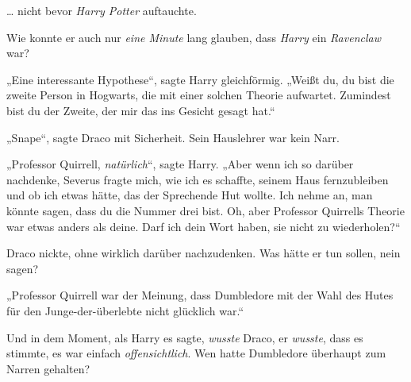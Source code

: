 … nicht bevor \emph{Harry Potter} auftauchte.

Wie konnte er auch nur \emph{eine Minute} lang glauben, dass \emph{Harry} ein \emph{Ravenclaw} war?

„Eine interessante Hypothese“, sagte Harry gleichförmig.
„Weißt du, du bist die zweite Person in Hogwarts, die mit einer solchen Theorie aufwartet. Zumindest bist du der Zweite, der mir das ins Gesicht gesagt hat.“

„Snape“, sagte Draco mit Sicherheit. Sein Hauslehrer war kein Narr.

„Professor Quirrell, \emph{natürlich}“, sagte Harry.
„Aber wenn ich so darüber nachdenke, Severus fragte mich, wie ich es schaffte, seinem Haus fernzubleiben und ob ich etwas hätte, das der Sprechende Hut wollte. Ich nehme an, man könnte sagen, dass du die Nummer drei bist. Oh, aber Professor Quirrells Theorie war etwas anders als deine. Darf ich dein Wort haben, sie nicht zu wiederholen?“

Draco nickte, ohne wirklich darüber nachzudenken. Was hätte er tun sollen, nein sagen?

„Professor Quirrell war der Meinung, dass Dumbledore mit der Wahl des Hutes für den Junge-der-überlebte nicht glücklich war.“

Und in dem Moment, als Harry es sagte, \emph{wusste} Draco, er \emph{wusste}, dass es stimmte, es war einfach \emph{offensichtlich}. Wen hatte Dumbledore überhaupt zum Narren gehalten?

